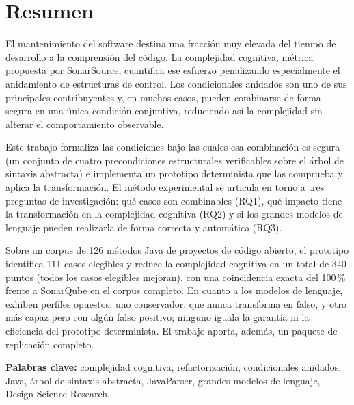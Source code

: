 
\chapter*{Resumen}

El mantenimiento del software destina una fracción muy elevada del tiempo de
desarrollo a la comprensión del código. La complejidad cognitiva, métrica
propuesta por SonarSource, cuantifica ese esfuerzo penalizando especialmente el
anidamiento de estructuras de control. Los condicionales anidados son uno de sus
principales contribuyentes y, en muchos casos, pueden combinarse de forma segura
en una única condición conjuntiva, reduciendo así la complejidad sin alterar el
comportamiento observable.

Este trabajo formaliza las condiciones bajo las cuales esa combinación es segura
(un conjunto de cuatro precondiciones estructurales verificables sobre el árbol
de sintaxis abstracta) e implementa un prototipo determinista que las comprueba y aplica la
transformación. El método experimental se articula en torno a tres preguntas de
investigación: qué casos son combinables (RQ1), qué impacto tiene la
transformación en la complejidad cognitiva (RQ2) y si los grandes modelos de
lenguaje pueden realizarla de forma correcta y automática (RQ3).

Sobre un corpus de 126 métodos Java de proyectos de código abierto, el prototipo
identifica 111 casos elegibles y reduce la complejidad cognitiva en un total de
340 puntos (todos los casos elegibles mejoran), con una coincidencia exacta
del 100\,\% frente a SonarQube en el corpus completo. En cuanto a los modelos de
lenguaje, exhiben perfiles opuestos: uno conservador, que nunca transforma en
falso, y otro más capaz pero con algún falso positivo; ninguno iguala la
garantía ni la eficiencia del prototipo determinista. El trabajo aporta, además,
un paquete de replicación completo.

\vspace{1em}
\noindent\textbf{Palabras clave:} complejidad cognitiva, refactorización,
condicionales anidados, Java, árbol de sintaxis abstracta, JavaParser, grandes
modelos de lenguaje, Design Science Research.

